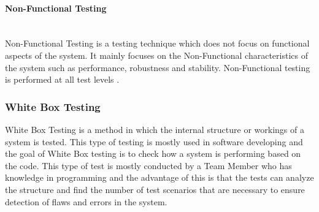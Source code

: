 \paragraph{Non-Functional Testing} \\
Non-Functional Testing is a testing technique which does not focus on functional aspects of the system. It mainly focuses on the Non-Functional characteristics of the system such as performance, robustness and stability. Non-Functional testing is performed at all test levels \cite{ref6}.

\subsubsection{White Box Testing}
White Box Testing is a method in which the internal structure or workings of a system is tested. This type of testing is mostly used in software developing and the goal of White Box testing is to check how a system is performing based on the code. This type of test is mostly conducted by a Team Member who has knowledge in programming and the advantage of this is that the tests can analyze the structure and find the number of test scenarios that are necessary to ensure detection of flaws and errors in the system. 